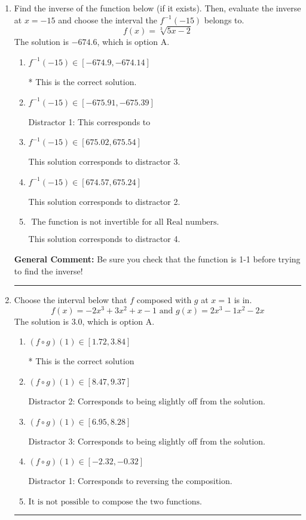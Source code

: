 \documentclass{extbook}[14pt]
\newcommand{\litem}[1]{\item #1

\rule{\textwidth}{0.4pt}}
\begin{document}
\begin{enumerate}\litem{
Find the inverse of the function below (if it exists). Then, evaluate the inverse at $x = -15$ and choose the interval the $f^{-1}(-15)$ belongs to.
\[ f(x) = \sqrt[3]{5 x - 2} \]The solution is \( -674.6 \), which is option A.\begin{enumerate}[label=\Alph*.]
\item \( f^{-1}(-15) \in [-674.9, -674.14] \)

* This is the correct solution.
\item \( f^{-1}(-15) \in [-675.91, -675.39] \)

 Distractor 1: This corresponds to 
\item \( f^{-1}(-15) \in [675.02, 675.54] \)

 This solution corresponds to distractor 3.
\item \( f^{-1}(-15) \in [674.57, 675.24] \)

 This solution corresponds to distractor 2.
\item \( \text{ The function is not invertible for all Real numbers. } \)

 This solution corresponds to distractor 4.
\end{enumerate}

\textbf{General Comment:} Be sure you check that the function is 1-1 before trying to find the inverse!
}
\litem{
Choose the interval below that $f$ composed with $g$ at $x=1$ is in.
\[ f(x) = -2x^{3} +3 x^{2} +x -1 \text{ and } g(x) = 2x^{3} -1 x^{2} -2 x \]The solution is \( 3.0 \), which is option A.\begin{enumerate}[label=\Alph*.]
\item \( (f \circ g)(1) \in [1.72, 3.84] \)

* This is the correct solution
\item \( (f \circ g)(1) \in [8.47, 9.37] \)

 Distractor 2: Corresponds to being slightly off from the solution.
\item \( (f \circ g)(1) \in [6.95, 8.28] \)

 Distractor 3: Corresponds to being slightly off from the solution.
\item \( (f \circ g)(1) \in [-2.32, -0.32] \)

 Distractor 1: Corresponds to reversing the composition.
\item \( \text{It is not possible to compose the two functions.} \)


\end{enumerate}

}
\end{enumerate}
\end{document}
